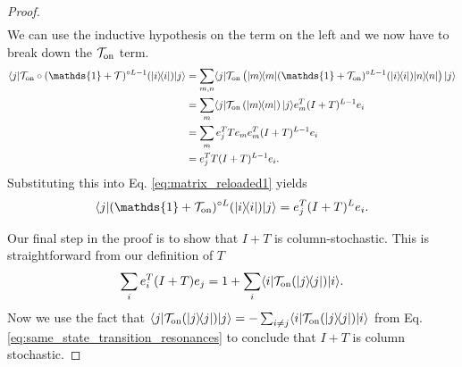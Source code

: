 \documentclass[
 amsmath,amssymb,
 aps,
onecolumn, 
nofootinbib]{revtex4-2}
\newcommand{\on}{\rm on}
\newcommand{\ket}[1]{|#1\rangle}
\newcommand{\bra}[1]{\langle #1|}
\newcommand{\ketbra}[2]{| #1\rangle\! \langle #2|}
\newcommand{\TT}{\mathcal{T}}
\newcommand{\identity}{\mathds{1}}
\begin{document}
\begin{proof}
\begin{align}
\end{align}
We can use the inductive hypothesis on the term on the left and we now have to break down the $\mathcal{T}_{\on}$ term. 
\begin{align}
    \bra{j} \mathcal{T}_{\on} \circ (\identity + \mathcal{T})^{\circ L - 1} (\ketbra{i}{i}) \ket{j} &= \sum_{m, n} \bra{j} \mathcal{T}_{\on}\left( \ketbra{m}{m} (\identity + \mathcal{T}_{\on})^{\circ L - 1} (\ketbra{i}{i}) \ketbra{n}{n} \right) \ket{j} \\
    &= \sum_{m} \bra{j} \mathcal{T}_{\on} \left( \ketbra{m}{m} \right) \ket{j} e_m^T (I + T)^{L - 1} e_i \\
    &= \sum_m e_j^T T e_m e_m^T (I + T)^{L -1} e_i \\
    &= e_j^T T(I + T)^{L-1} e_i.
\end{align}
Substituting this into Eq. \eqref{eq:matrix_reloaded1} yields \begin{equation}
     \bra{j} (\identity + \mathcal{T}_{\on})^{\circ L}(\ketbra{i}{i}) \ket{j} = e_j^T (I + T)^{L} e_i.
\end{equation} 


Our final step in the proof is to show that $I + T$ is column-stochastic. This is straightforward from our definition of $T$
\begin{equation}
    \sum_i e_i^T (I + T) e_j = 1 + \sum_i \bra{i} \mathcal{T}_{\on}(\ketbra{j}{j}) \ket{i}.
\end{equation}
Now we use the fact that $\bra{j} \TT_{\on}(\ketbra{j}{j}) \ket{j} = - \sum_{i \neq j} \bra{i} \TT_{\on}(\ketbra{j}{j}) \ket{i}$ from Eq. \eqref{eq:same_state_transition_resonances} to conclude that $I + T$ is column stochastic.
\end{proof}
\end{document}
